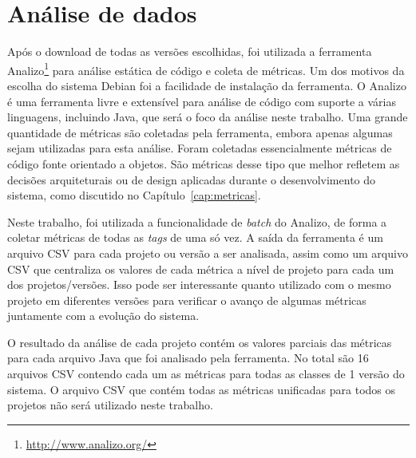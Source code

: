 \section{Análise de dados}

Após o download de todas as versões escolhidas, foi utilizada a ferramenta Analizo\footnote{\url{http://www.analizo.org/}}  para análise estática de código e coleta de métricas. Um dos motivos da escolha do sistema Debian foi a facilidade de instalação da ferramenta. O Analizo é uma ferramenta livre e extensível para análise de código com suporte a várias linguagens, incluindo Java, que será o foco da análise neste trabalho. Uma grande quantidade de métricas são coletadas pela ferramenta, embora apenas algumas sejam utilizadas para esta análise. Foram coletadas essencialmente métricas de código fonte orientado a objetos. São métricas desse tipo que melhor refletem as decisões arquiteturais ou de design aplicadas durante o desenvolvimento do sistema, como discutido no Capítulo~\ref{cap:metricas}.

Neste trabalho, foi utilizada a funcionalidade de \textit{batch} do Analizo, de forma a coletar métricas de todas as \textit{tags} de uma só vez. A saída da ferramenta é um arquivo CSV para cada projeto ou versão a ser analisada, assim como um arquivo CSV que centraliza os valores de cada métrica a nível de projeto para cada um dos projetos/versões. Isso pode ser interessante quanto utilizado com o mesmo projeto em diferentes versões para verificar o avanço de algumas métricas juntamente com a evolução do sistema.

O resultado da análise de cada projeto contém os valores parciais das métricas para cada arquivo Java que foi analisado pela ferramenta. No total são 16 arquivos CSV contendo cada um as métricas para todas as classes de 1 versão do sistema. O arquivo CSV que contém todas as métricas unificadas para todos os projetos não será utilizado neste trabalho. 


